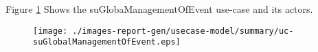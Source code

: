 Figure \ref{fig:lu.uni.lassy.excalibur.group09.spec-RE-UCD-uc-suGlobalManagementOfEvent}
Shows the suGlobaManagementOfEvent use-case and its actors.

\begin{figure}[htbp]
\begin{center}

\texttt{[image: ./images-report-gen/usecase-model/summary/uc-suGlobalManagementOfEvent.eps]}
\end{center}
\caption[lu.uni.lassy.excalibur.group09.spec Use Case Diagram: uc-suGlobalManagementOfEvent]{}
\label{fig:lu.uni.lassy.excalibur.group09.spec-RE-UCD-uc-suGlobalManagementOfEvent}
\end{figure}
\vspace{0.5cm}
